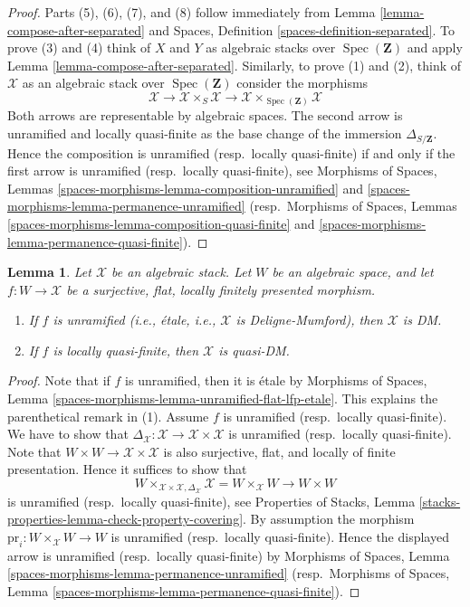 \documentclass{stacks-project}
\theoremstyle{plain}
\newtheorem{lemma}[subsection]{Lemma}
\theoremstyle{definition}
\theoremstyle{remark}
\numberwithin{equation}{subsection}
\def\Spec{\mathop{\mathrm{Spec}}}
\begin{document}
\begin{proof}
Parts (5), (6), (7), and (8) follow immediately from
Lemma \ref{lemma-compose-after-separated}
and
Spaces, Definition \ref{spaces-definition-separated}.
To prove (3) and (4) think of $X$ and $Y$ as algebraic stacks over
$\Spec(\mathbf{Z})$ and apply
Lemma \ref{lemma-compose-after-separated}.
Similarly, to prove (1) and (2), think of $\mathcal{X}$ as an algebraic
stack over $\Spec(\mathbf{Z})$ consider the
morphisms
$$
\mathcal{X} \longrightarrow
\mathcal{X} \times_S \mathcal{X} \longrightarrow
\mathcal{X} \times_{\Spec(\mathbf{Z})} \mathcal{X}
$$
Both arrows are representable by algebraic spaces.
The second arrow is unramified and locally quasi-finite as the base change of
the immersion $\Delta_{S/\mathbf{Z}}$. Hence the composition is
unramified (resp.\ locally quasi-finite) if and only if the first arrow
is unramified (resp.\ locally quasi-finite), see
Morphisms of Spaces,
Lemmas \ref{spaces-morphisms-lemma-composition-unramified} and
\ref{spaces-morphisms-lemma-permanence-unramified}
(resp.\ Morphisms of Spaces,
Lemmas \ref{spaces-morphisms-lemma-composition-quasi-finite} and
\ref{spaces-morphisms-lemma-permanence-quasi-finite}).
\end{proof}

\begin{lemma}
\label{lemma-properties-covering-imply-diagonal}
Let $\mathcal{X}$ be an algebraic stack.
Let $W$ be an algebraic space, and let $f : W \to \mathcal{X}$
be a surjective, flat, locally finitely presented morphism.
\begin{enumerate}
\item If $f$ is unramified (i.e., \'etale, i.e., $\mathcal{X}$
is Deligne-Mumford), then $\mathcal{X}$ is DM.
\item If $f$ is locally quasi-finite, then $\mathcal{X}$ is quasi-DM.
\end{enumerate}
\end{lemma}

\begin{proof}
Note that if $f$ is unramified, then it is \'etale by
Morphisms of Spaces, Lemma
\ref{spaces-morphisms-lemma-unramified-flat-lfp-etale}.
This explains the parenthetical remark in (1).
Assume $f$ is unramified (resp.\ locally quasi-finite). We have to show that
$\Delta_\mathcal{X} : \mathcal{X} \to \mathcal{X} \times \mathcal{X}$
is unramified (resp.\ locally quasi-finite). Note that
$W \times W \to \mathcal{X} \times \mathcal{X}$ is also
surjective, flat, and locally of finite presentation. Hence it suffices to
show that
$$
W \times_{\mathcal{X} \times \mathcal{X}, \Delta_\mathcal{X}} \mathcal{X}
=
W \times_\mathcal{X} W
\longrightarrow
W \times W
$$
is unramified (resp.\ locally quasi-finite), see
Properties of Stacks, Lemma
\ref{stacks-properties-lemma-check-property-covering}.
By assumption the morphism $\text{pr}_i : W \times_\mathcal{X} W \to W$
is unramified (resp.\ locally quasi-finite). Hence
the displayed arrow is unramified (resp.\ locally quasi-finite) by
Morphisms of Spaces, Lemma
\ref{spaces-morphisms-lemma-permanence-unramified}
(resp.\ Morphisms of Spaces, Lemma
\ref{spaces-morphisms-lemma-permanence-quasi-finite}).
\end{proof}
\end{document}
